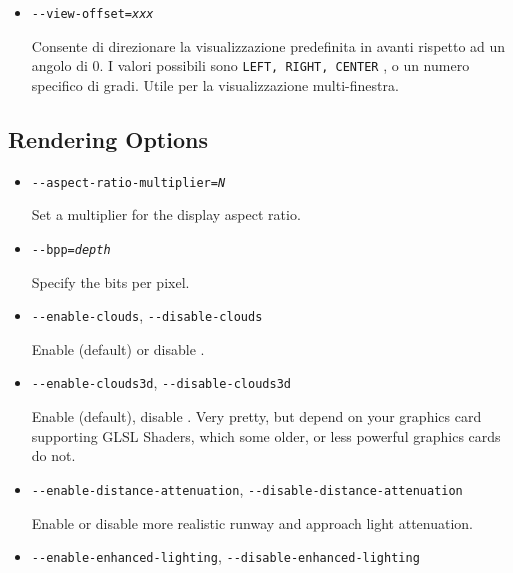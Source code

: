 \begin{itemize}
{\begin{itemize}
  Configura il filtro anisotropico della texture. I valori disponibili sono: 1
  (impostazione predefinita), 2, 4, 8 o 16.

  \item{\texttt{-$ $-view-offset={\it xxx}}}

  Consente di direzionare la visualizzazione predefinita in avanti
  rispetto ad un angolo di 0. I valori possibili sono \texttt{LEFT, RIGHT, CENTER}
  , o un numero specifico di gradi. Utile per la visualizzazione multi-finestra.

  \end{itemize}

}
{
  \subsection{Rendering Options}
  \begin{itemize}

  \item{\texttt{-$ $-aspect-ratio-multiplier={\it N}}}

  Set a multiplier for the display aspect ratio.

  \item{\texttt{-$ $-bpp={\it depth}}}

  Specify the bits per pixel.

  \item{\texttt{-$ $-enable-clouds}, \texttt{-$ $-disable-clouds}}

  Enable (default) or disable .

  \item{\texttt{-$ $-enable-clouds3d}, \texttt{-$ $-disable-clouds3d}}

  Enable (default), disable . Very pretty, but depend on your graphics card supporting
  GLSL Shaders, which some older, or less powerful graphics cards do not.

  \item{\texttt{-$ $-enable-distance-attenuation}, \texttt{-$ $-disable-distance-attenuation}}

  Enable or disable more realistic runway and approach light attenuation.

  \item{\texttt{-$ $-enable-enhanced-lighting}, \texttt{-$ $-disable-enhanced-lighting}}


\end{itemize}}
\end{itemize}
